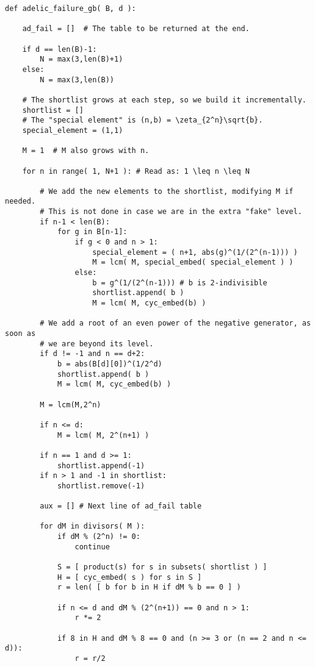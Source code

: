 \documentclass[10pt,a4paper]{article}
\theoremstyle{definition}
\begin{document}
\lstset{language=Python}
\begin{lstlisting}
def adelic_failure_gb( B, d ):

    ad_fail = []  # The table to be returned at the end.
    
    if d == len(B)-1:
        N = max(3,len(B)+1)
    else:
        N = max(3,len(B))

    # The shortlist grows at each step, so we build it incrementally.
    shortlist = []
    # The "special element" is (n,b) = \zeta_{2^n}\sqrt{b}.
    special_element = (1,1)

    M = 1  # M also grows with n.

    for n in range( 1, N+1 ): # Read as: 1 \leq n \leq N

        # We add the new elements to the shortlist, modifying M if needed.
        # This is not done in case we are in the extra "fake" level.
        if n-1 < len(B):
            for g in B[n-1]:
                if g < 0 and n > 1:
                    special_element = ( n+1, abs(g)^(1/(2^(n-1))) )
                    M = lcm( M, special_embed( special_element ) )
                else:
                    b = g^(1/(2^(n-1))) # b is 2-indivisible
                    shortlist.append( b )
                    M = lcm( M, cyc_embed(b) )

        # We add a root of an even power of the negative generator, as soon as
        # we are beyond its level.
        if d != -1 and n == d+2:        
            b = abs(B[d][0])^(1/2^d)
            shortlist.append( b ) 
            M = lcm( M, cyc_embed(b) )

        M = lcm(M,2^n)
            
        if n <= d:
            M = lcm( M, 2^(n+1) )

        if n == 1 and d >= 1:
            shortlist.append(-1)
        if n > 1 and -1 in shortlist:
            shortlist.remove(-1)

        aux = [] # Next line of ad_fail table

        for dM in divisors( M ):
            if dM % (2^n) != 0:
                continue
                
            S = [ product(s) for s in subsets( shortlist ) ]
            H = [ cyc_embed( s ) for s in S ] 
            r = len( [ b for b in H if dM % b == 0 ] )

            if n <= d and dM % (2^(n+1)) == 0 and n > 1:
                r *= 2

            if 8 in H and dM % 8 == 0 and (n >= 3 or (n == 2 and n <= d)):
                r = r/2


\end{lstlisting}
\end{document}
